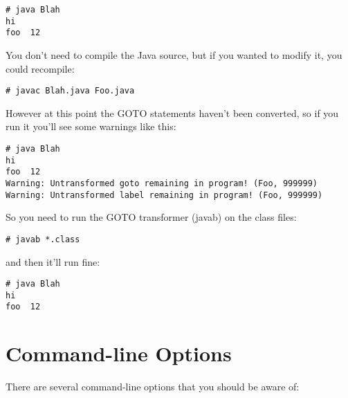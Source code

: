 \documentclass[11pt]{article}
\begin{document}
\begin{verbatim}
# java Blah
hi
foo  12
\end{verbatim}

You don't need to compile the Java source, but if you wanted to modify it,
you could recompile:

\begin{verbatim}
# javac Blah.java Foo.java
\end{verbatim}

However at this point the GOTO statements haven't been converted, so if you
run it you'll see some warnings like this:

\begin{verbatim}
# java Blah
hi
foo  12
Warning: Untransformed goto remaining in program! (Foo, 999999)
Warning: Untransformed label remaining in program! (Foo, 999999)
\end{verbatim}

So you need to run the GOTO transformer (javab) on the class files:

\begin{verbatim}
# javab *.class
\end{verbatim}

and then it'll run fine:

\begin{verbatim}
# java Blah
hi
foo  12
\end{verbatim}

\section{Command-line Options}

There are several command-line options that you should be aware of: 
\end{document}
